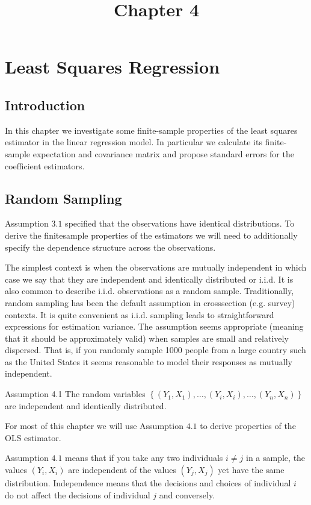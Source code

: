 \documentclass[10pt]{article}
\title{Chapter 4 }
\author{}
\date{}
\begin{document}
\maketitle
\section{Least Squares Regression}
\subsection{Introduction}
In this chapter we investigate some finite-sample properties of the least squares estimator in the linear regression model. In particular we calculate its finite-sample expectation and covariance matrix and propose standard errors for the coefficient estimators.

\subsection{Random Sampling}
Assumption $3.1$ specified that the observations have identical distributions. To derive the finitesample properties of the estimators we will need to additionally specify the dependence structure across the observations.

The simplest context is when the observations are mutually independent in which case we say that they are independent and identically distributed or i.i.d. It is also common to describe i.i.d. observations as a random sample. Traditionally, random sampling has been the default assumption in crosssection (e.g. survey) contexts. It is quite convenient as i.i.d. sampling leads to straightforward expressions for estimation variance. The assumption seems appropriate (meaning that it should be approximately valid) when samples are small and relatively dispersed. That is, if you randomly sample 1000 people from a large country such as the United States it seems reasonable to model their responses as mutually independent.

Assumption 4.1 The random variables $\left\{\left(Y_{1}, X_{1}\right), \ldots,\left(Y_{i}, X_{i}\right), \ldots,\left(Y_{n}, X_{n}\right)\right\}$ are independent and identically distributed.

For most of this chapter we will use Assumption $4.1$ to derive properties of the OLS estimator.

Assumption $4.1$ means that if you take any two individuals $i \neq j$ in a sample, the values $\left(Y_{i}, X_{i}\right)$ are independent of the values $\left(Y_{j}, X_{j}\right)$ yet have the same distribution. Independence means that the decisions and choices of individual $i$ do not affect the decisions of individual $j$ and conversely.
\end{document}
